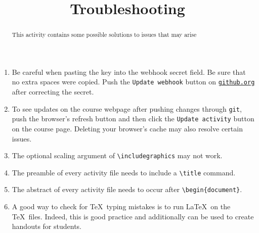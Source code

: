\documentclass{ximera}
\title{Troubleshooting}
\begin{document}
\begin{abstract}
This activity contains some possible solutions
to issues that may arise
\end{abstract}
\begin{enumerate}
 \item Be careful when pasting the key into
the webhook secret field. Be sure that no extra
spaces were copied. Push the \verb!Update webhook! button on
\href{http://github.org}{\tt github.org}
after correcting the secret.

\item To see updates on the course webpage
after pushing changes through \verb!git!,
push the browser's refresh button
and then click the \verb!Update activity! button 
on the course page. Deleting your browser's cache
may also resolve certain issues.

\item The optional scaling argument of \verb!\includegraphics!
may not work.

\item The preamble of every activity file needs to 
include a \verb!\title! command. 

\item The abstract of every activity file
needs to occur after \verb!\begin{document}!.

\item A good way to check for \TeX\ typing mistakes
is to run \LaTeX\ on the \TeX\ files. Indeed, this
is good practice and additionally can be used
to create handouts for students.
\end{enumerate}
\end{document}
